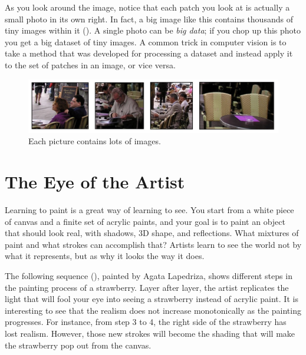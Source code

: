 As you look around the image, notice that each patch you look at is actually a small photo in its own right. In fact, a big image like this contains thousands of tiny images within it (\fig{\ref{fig:tiny_images}}). A single photo can be \textit{big data}; if you chop up this photo you get a big dataset of tiny images.
A common trick in computer vision is to take a method that was developed for processing a dataset and instead apply it to the set of patches in an image, or vice versa.


\begin{figure}[t]
    \centerline{
        \includegraphics[width=1\linewidth]{figures/visionscience/tiny_images.jpg}
    }
    \caption{Each picture contains lots of images.}
    \label{fig:tiny_images}
\end{figure}



\section{The Eye of the Artist}

Learning to paint is a great way of learning to see. You start from a white piece of canvas and a finite set of acrylic paints, and your goal is to paint an object that should look real, with shadows, 3D shape, and reflections. What mixtures of paint and what strokes can accomplish that? Artists learn to see the world not by what it represents, but as why it looks the way it does.

The following sequence (\fig{\ref{fig:agata_painting}}), painted by Agata Lapedriza, shows different steps in the painting process of a strawberry. Layer after layer, the artist replicates the light that will fool your eye into seeing a strawberry instead of acrylic paint. It is interesting to see that the realism does not increase monotonically as the painting progresses. For instance, from step 3 to 4, the right side of the strawberry has lost realism. However, those new strokes will become the shading that will make the strawberry pop out from the canvas.


